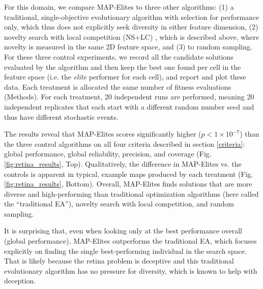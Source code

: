 \documentclass[twocolumn, DIV25, 9pt]{scrartcl}
\newcommand{\todoOfficialVersion}[1]{} %
\begin{document}
For this domain, we compare MAP-Elites to three other algorithms: (1) a traditional, single-objective evolutionary algorithm with selection for performance only, which thus does not explicitly seek diversity in either feature dimension, (2) novelty search with local competition (NS+LC) \cite{lehman2011evolving}, which is described above, where novelty is measured in the same 2D feature space, and (3) to random sampling. \todoOfficialVersion{shouldn't  we compare to MOLE too; seems like the best/only place for us to show why MAP-Elites is better than MOLE}For these three control experiments, we record all the candidate solutions evaluated by the algorithm and then keep the best one found per cell in the feature space (i.e. the \emph{elite} performer for each cell), and report and plot these data. Each treatment is allocated the same number of fitness evaluations (Methods). For each treatment, 20 independent runs are performed, meaning 20 independent replicates that each start with a different random number seed and thus have different stochastic events. 

The results reveal that MAP-Elites scores significantly higher ($p < 1 \times 10^{-7}$) than the three control algorithms on all four criteria described in section \ref{criteria}: global performance, global reliability, precision, and coverage (Fig. \ref{fig:retina_results}, Top). Qualitatively, the difference in MAP-Elites vs. the controls is apparent in typical, example maps produced by each treatment (Fig. \ref{fig:retina_results}, Bottom).  Overall, MAP-Elites finds solutions that are more diverse and high-performing than traditional optimization algorithms (here called the ``traditional EA''), novelty search with local competition, and random sampling. 
\todoOfficialVersion{We should compare to NS too, and MOLE}

It is surprising that, even when looking only at the best performance overall (global performance), MAP-Elites outperforms the traditional EA, which focuses explicitly on finding the single best-performing individual in the search space. That is likely because the retina problem is deceptive\cite{clune2013originModularity} and this traditional evolutionary algorithm has no pressure for diversity, which is known to help with deception\cite{floreano2008bio}. 
\end{document}

